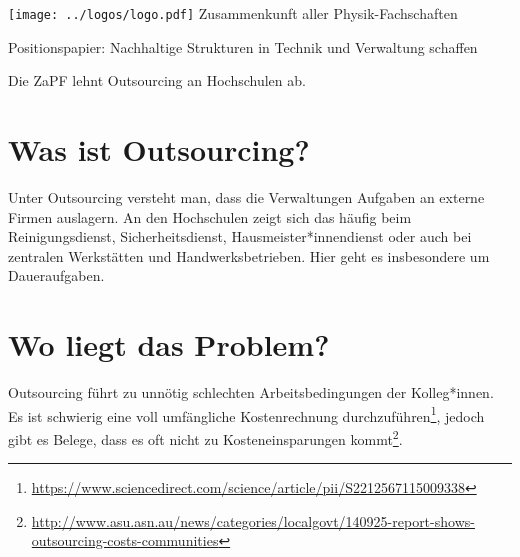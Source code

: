 \documentclass[DIV=calc]{scrartcl}
\let\oldgrqq=\grqq
\def\grqq{\oldgrqq\xspace}
\begin{document}
\hspace{0.87\textwidth}
\begin{minipage}{120pt}
	\vspace{-1.8cm}
	\texttt{[image: ../logos/logo.pdf]}
	\centering
	\small Zusammenkunft aller Physik-Fachschaften
\end{minipage}

\begin{center}
  \huge{Positionspapier: \glqq Nachhaltige Strukturen in Technik und Verwaltung schaffen\grqq}\vspace{.25\baselineskip}\\
  \normalsize
\end{center}
\vspace{1cm}







Die ZaPF lehnt Outsourcing an Hochschulen ab.

\vspace{-5mm}\section*{Was ist Outsourcing?} \vspace{-5mm}
Unter Outsourcing versteht man, dass die Verwaltungen Aufgaben an externe Firmen auslagern. An den Hochschulen zeigt sich das häufig beim Reinigungsdienst, Sicherheitsdienst, Hausmeister*innendienst oder auch bei zentralen Werkstätten und Handwerksbetrieben. Hier geht es insbesondere um Daueraufgaben.

\vspace{-5mm}\section*{Wo liegt das Problem?} \vspace{-5mm}
Outsourcing führt zu unnötig schlechten Arbeitsbedingungen der Kolleg*innen. Es ist schwierig eine voll umfängliche Kostenrechnung durchzuführen\footnote{\url{https://www.sciencedirect.com/science/article/pii/S2212567115009338}}, jedoch gibt es Belege, dass es oft nicht zu Kosteneinsparungen kommt\footnote{\url{http://www.asu.asn.au/news/categories/localgovt/140925-report-shows-outsourcing-costs-communities}}.
\end{document}
